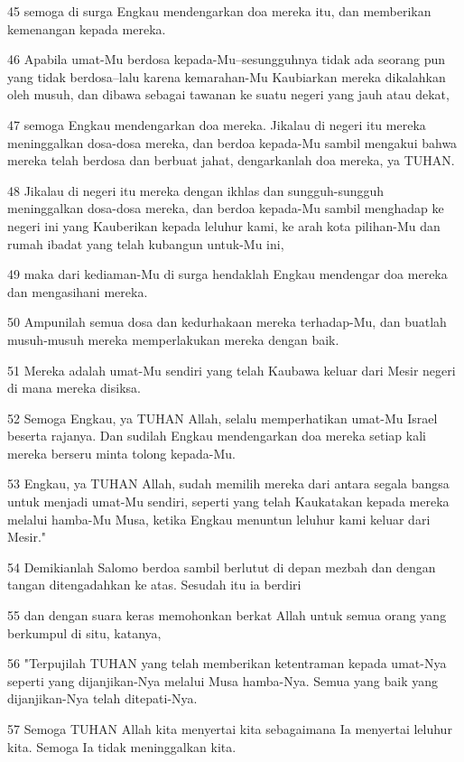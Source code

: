 \par 45 semoga di surga Engkau mendengarkan doa mereka itu, dan memberikan kemenangan kepada mereka.
\par 46 Apabila umat-Mu berdosa kepada-Mu--sesungguhnya tidak ada seorang pun yang tidak berdosa--lalu karena kemarahan-Mu Kaubiarkan mereka dikalahkan oleh musuh, dan dibawa sebagai tawanan ke suatu negeri yang jauh atau dekat,
\par 47 semoga Engkau mendengarkan doa mereka. Jikalau di negeri itu mereka meninggalkan dosa-dosa mereka, dan berdoa kepada-Mu sambil mengakui bahwa mereka telah berdosa dan berbuat jahat, dengarkanlah doa mereka, ya TUHAN.
\par 48 Jikalau di negeri itu mereka dengan ikhlas dan sungguh-sungguh meninggalkan dosa-dosa mereka, dan berdoa kepada-Mu sambil menghadap ke negeri ini yang Kauberikan kepada leluhur kami, ke arah kota pilihan-Mu dan rumah ibadat yang telah kubangun untuk-Mu ini,
\par 49 maka dari kediaman-Mu di surga hendaklah Engkau mendengar doa mereka dan mengasihani mereka.
\par 50 Ampunilah semua dosa dan kedurhakaan mereka terhadap-Mu, dan buatlah musuh-musuh mereka memperlakukan mereka dengan baik.
\par 51 Mereka adalah umat-Mu sendiri yang telah Kaubawa keluar dari Mesir negeri di mana mereka disiksa.
\par 52 Semoga Engkau, ya TUHAN Allah, selalu memperhatikan umat-Mu Israel beserta rajanya. Dan sudilah Engkau mendengarkan doa mereka setiap kali mereka berseru minta tolong kepada-Mu.
\par 53 Engkau, ya TUHAN Allah, sudah memilih mereka dari antara segala bangsa untuk menjadi umat-Mu sendiri, seperti yang telah Kaukatakan kepada mereka melalui hamba-Mu Musa, ketika Engkau menuntun leluhur kami keluar dari Mesir."
\par 54 Demikianlah Salomo berdoa sambil berlutut di depan mezbah dan dengan tangan ditengadahkan ke atas. Sesudah itu ia berdiri
\par 55 dan dengan suara keras memohonkan berkat Allah untuk semua orang yang berkumpul di situ, katanya,
\par 56 "Terpujilah TUHAN yang telah memberikan ketentraman kepada umat-Nya seperti yang dijanjikan-Nya melalui Musa hamba-Nya. Semua yang baik yang dijanjikan-Nya telah ditepati-Nya.
\par 57 Semoga TUHAN Allah kita menyertai kita sebagaimana Ia menyertai leluhur kita. Semoga Ia tidak meninggalkan kita.
